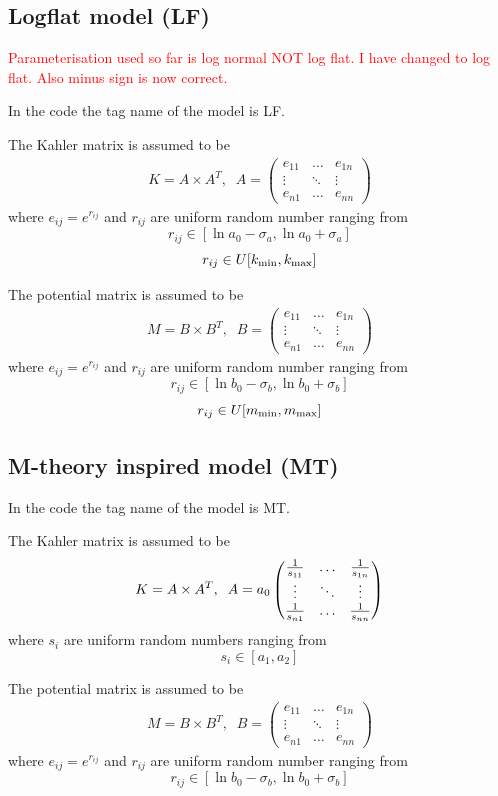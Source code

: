 \documentclass[12pt]{article}
\newcommand{\tkDM}[1]{\textcolor{red}{#1}}                     %
\newcommand{\beq}{\begin{equation}}
\newcommand{\eeq}{\end{equation}}
\newcommand{\beqa}{\begin{eqnarray}}
\newcommand{\eeqa}{\end{eqnarray}}
\begin{document}
\subsection{Logflat model (LF)}

\tkDM{Parameterisation used so far is log normal NOT log flat. I have changed to log flat. Also minus sign is now correct.}

In the code the tag name of the model is LF.

The Kahler matrix is assumed to be
\beqa
K = A\times A^T,\;\; A = \begin{pmatrix} e_{11} & \ldots & e_{1n} \\ \vdots & \ddots & \vdots \\ e_{n1} & \ldots & e_{nn} \end{pmatrix}
\eeqa
where $e_{ij} = e^{r_{ij}}$ and $r_{ij}$ are uniform random number ranging from
\beq
r_{ij} \in [\ln a_0 -\sigma_a, \ln a_0 + \sigma_a]
\eeq
\tkDM{
\beq
r_{ij} \in U[k_{\rm min},k_{\rm max}]
\eeq
}

The potential matrix is assumed to be
\beqa
M = B\times B^T,\;\; B = \begin{pmatrix} e_{11} & \ldots & e_{1n} \\ \vdots & \ddots & \vdots \\ e_{n1} & \ldots & e_{nn} \end{pmatrix}
\eeqa
where $e_{ij} = e^{r_{ij}}$ and $r_{ij}$ are uniform random number ranging from
\beq
r_{ij} \in [\ln b_0 -\sigma_b, \ln b_0 + \sigma_b]
\eeq
\tkDM{
\beq
r_{ij} \in U[m_{\rm min},m_{\rm max}]
\eeq
}


\subsection{M-theory inspired model (MT)}

In the code the tag name of the model is MT.

The Kahler matrix is assumed to be
\beq
K = A\times A^T,\;\;
A = a_0  \begin{pmatrix} {1\over s_{11}} & \ldots & {1\over s_{1n}} \\ \vdots & \ddots & \vdots \\ {1\over s_{n1}} & \ldots & {1\over s_{nn}} \end{pmatrix}
\eeq
where $s_i$ are uniform random numbers ranging from
\beq
s_i \in [a_1,a_2]
\eeq

The potential matrix is assumed to be
\beqa
M = B\times B^T,\;\; B = \begin{pmatrix} e_{11} & \ldots & e_{1n} \\ \vdots & \ddots & \vdots \\ e_{n1} & \ldots & e_{nn} \end{pmatrix}
\eeqa
where $e_{ij} = e^{r_{ij}}$ and $r_{ij}$ are uniform random number ranging from
\beq
r_{ij} \in [\ln b_0 -\sigma_b, \ln b_0 + \sigma_b]
\eeq
\end{document}

